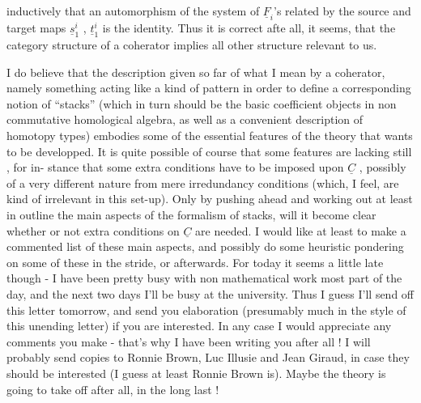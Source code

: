 
 inductively that an automorphism of the system of $\underline{F}_i$'s  related by the
source and target maps $\underline{s}_1^i$ , $\underline{t}_1^i$  is the identity.  Thus it is correct afte
all, it seems,  that the category structure of a coherator implies all
other structure relevant to us.

I do believe that the description given so far of what I mean by a
coherator,  namely something acting like a kind of pattern in
order to define a corresponding notion of ``stacks'' (which in turn should
be the basic coefficient objects in non commutative homological algebra,
as well as a convenient description of homotopy types) embodies some of
the essential features of the theory  that wants to be developped. It is
quite possible of course that some features are lacking still ,  for in-%
stance that some extra conditions have to be imposed upon $\underline{C}$ ,  possibly
of a very different nature from mere irredundancy conditions (which, I
feel, are kind of irrelevant in this set-up).  Only by pushing ahead
and working out at least in outline the main aspects of the formalism of
stacks,  will it become clear whether or not extra conditions on $\underline{C}$ are
needed.  I would like at least to make a commented list of these main
aspects,  and possibly do some heuristic pondering on some of these in
the stride,  or afterwards.  For today it seems a little late though  -
I have been pretty busy with non mathematical work most part of the day,
and the next two days I'll be busy at the university.  Thus I guess I'll
send off this letter tomorrow,  and send you   elaboration  (presumably
much in the style of this unending letter)  if you are interested.  In
any case I would appreciate any comments you make  -  that's why I have
been writing you after all !  I will probably send copies to Ronnie
Brown,  Luc Illusie and Jean Giraud,  in case they should be interested
(I guess at least Ronnie Brown is).  Maybe the theory is going to take
off after all,  in the long last !

